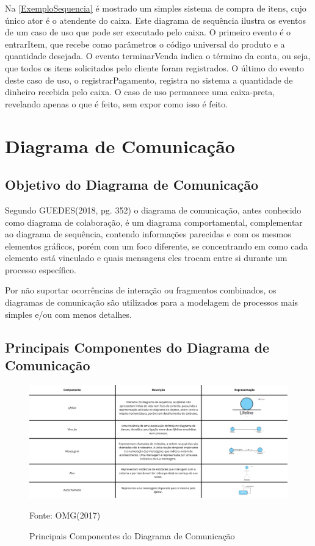 \documentclass[12pt,openright,oneside,a4paper,
	chapter=TITLE,
	section=TITLE,
	english,brazil]{abntex2}
\begin{document}
Na \autoref{ExemploSequencia} é mostrado um simples sistema de compra de itens, cujo único ator é o atendente do caixa. Este diagrama de sequência ilustra os eventos de um caso de uso que pode ser executado pelo caixa. O primeiro evento é o entrarItem, que recebe como parâmetros o código universal do produto e a quantidade desejada. O evento terminarVenda indica o término da conta, ou seja, que todos os itens solicitados pelo cliente foram registrados. O último do evento deste caso de uso, o registrarPagamento, registra no sistema a quantidade de dinheiro recebida pelo caixa.  O caso de uso permanece uma caixa-preta, revelando apenas o que é feito, sem expor como isso é feito.

\chapter{Diagrama de Comunicação}

\section{Objetivo do Diagrama de Comunicação}
Segundo GUEDES(2018, pg. 352) o diagrama de comunicação, antes conhecido como diagrama de colaboração, é um diagrama comportamental, complementar ao diagrama de sequência, contendo informações parecidas e com os mesmos elementos gráficos, porém com um foco diferente, se concentrando em como cada elemento está vinculado e quais mensagens eles trocam entre si durante um processo específico.

Por não suportar ocorrências de interação ou fragmentos combinados, os diagramas de comunicação são utilizados para a modelagem de processos mais simples e/ou com menos detalhes.

\section{Principais Componentes do Diagrama de Comunicação}

\begin{figure}[!htp]
	\caption{Principais Componentes do Diagrama de Comunicação}
	\centering
	\includegraphics[scale=0.2]{img/Componentes Principais do Diagrama de Comunicação.png}
	\\

	\footnotesize\raggedright Fonte: OMG(2017)
\end{figure}
\end{document}
